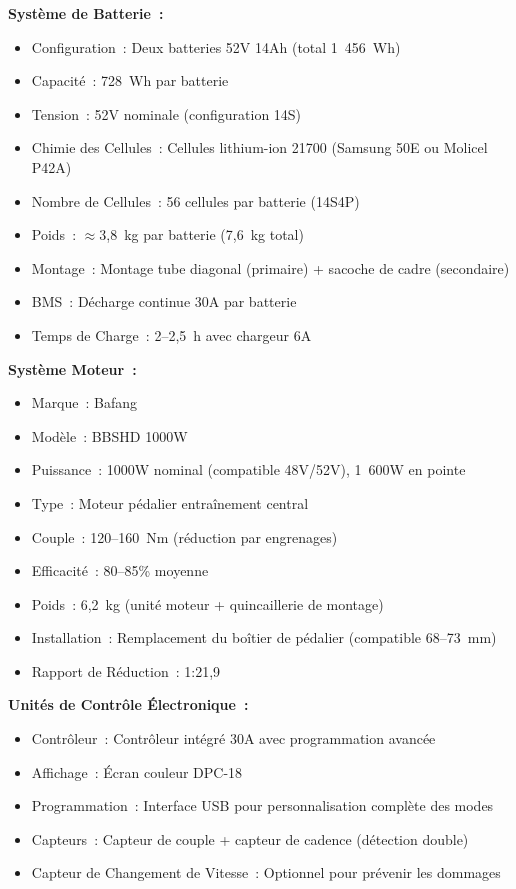 \documentclass[12pt,a4paper]{article}
\begin{document}
\textbf{Système de Batterie~:}
\begin{itemize}
    \item Configuration~: Deux batteries 52V 14Ah (total 1~456~Wh)
    \item Capacité~: 728~Wh par batterie
    \item Tension~: 52V nominale (configuration 14S)
    \item Chimie des Cellules~: Cellules lithium-ion 21700 (Samsung 50E ou Molicel P42A) \cite{samsung-50e, molicel-p42a}
    \item Nombre de Cellules~: 56 cellules par batterie (14S4P)
    \item Poids~: $\approx$3,8~kg par batterie (7,6~kg total)
    \item Montage~: Montage tube diagonal (primaire) + sacoche de cadre (secondaire)
    \item BMS~: Décharge continue 30A par batterie
    \item Temps de Charge~: 2--2,5~h avec chargeur 6A
\end{itemize}

\textbf{Système Moteur~:}
\begin{itemize}
    \item Marque~: Bafang
    \item Modèle~: BBSHD 1000W \cite{bafang-bbshd}
    \item Puissance~: 1000W nominal (compatible 48V/52V), 1~600W en pointe
    \item Type~: Moteur pédalier entraînement central
    \item Couple~: 120--160~Nm (réduction par engrenages)
    \item Efficacité~: 80--85\% moyenne
    \item Poids~: 6,2~kg (unité moteur + quincaillerie de montage)
    \item Installation~: Remplacement du boîtier de pédalier (compatible 68--73~mm)
    \item Rapport de Réduction~: 1:21,9
\end{itemize}

\textbf{Unités de Contrôle Électronique~:}
\begin{itemize}
    \item Contrôleur~: Contrôleur intégré 30A avec programmation avancée
    \item Affichage~: Écran couleur DPC-18
    \item Programmation~: Interface USB pour personnalisation complète des modes
    \item Capteurs~: Capteur de couple + capteur de cadence (détection double)
    \item Capteur de Changement de Vitesse~: Optionnel pour prévenir les dommages
\end{itemize}
\end{document}
